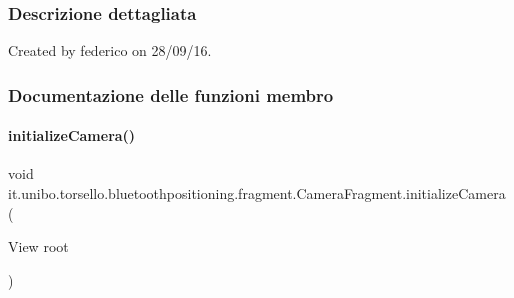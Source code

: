 \subsubsection{Descrizione dettagliata}
Created by federico on 28/09/16. 

\subsubsection{Documentazione delle funzioni membro}
\hypertarget{classit_1_1unibo_1_1torsello_1_1bluetoothpositioning_1_1fragment_1_1CameraFragment_a2af65faee5cb478bcf85ef8fd4cee10f_a2af65faee5cb478bcf85ef8fd4cee10f}{}\label{classit_1_1unibo_1_1torsello_1_1bluetoothpositioning_1_1fragment_1_1CameraFragment_a2af65faee5cb478bcf85ef8fd4cee10f_a2af65faee5cb478bcf85ef8fd4cee10f} 
\paragraph{\texorpdfstring{initialize\+Camera()}{initializeCamera()}}
{\footnotesize\ttfamily void it.\+unibo.\+torsello.\+bluetoothpositioning.\+fragment.\+Camera\+Fragment.\+initialize\+Camera (\begin{DoxyParamCaption}\item[{View}]{root }\end{DoxyParamCaption})\hspace{0.3cm}{\ttfamily [private]}}


